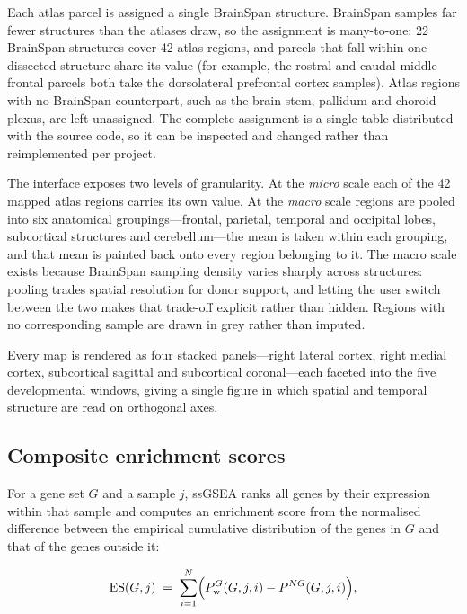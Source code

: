 \documentclass[pdflatex,sn-basic]{sn-jnl}
\begin{document}
Each atlas parcel is assigned a single BrainSpan structure. BrainSpan samples
far fewer structures than the atlases draw, so the assignment is many-to-one:
22 BrainSpan structures cover 42 atlas regions, and parcels that fall within
one dissected structure share its value (for example, the rostral and caudal
middle frontal parcels both take the dorsolateral prefrontal cortex samples).
Atlas regions with no BrainSpan counterpart, such as the brain stem, pallidum
and choroid plexus, are left unassigned. The complete assignment is a single
table distributed with the source code, so it can be inspected and changed
rather than reimplemented per project.

The interface exposes two levels of granularity. At the \emph{micro} scale each
of the 42 mapped atlas regions carries its own value. At the \emph{macro} scale
regions are pooled into six anatomical groupings---frontal, parietal, temporal
and occipital lobes, subcortical structures and cerebellum---the mean is taken
within each grouping, and that mean is painted back onto every region belonging
to it. The macro scale exists because BrainSpan sampling density varies sharply
across structures: pooling trades spatial resolution for donor support, and
letting the user switch between the two makes that trade-off explicit rather
than hidden. Regions with no corresponding sample are drawn in grey rather than
imputed.

Every map is rendered as four stacked panels---right lateral cortex, right
medial cortex, subcortical sagittal and subcortical coronal---each faceted into
the five developmental windows, giving a single figure in which spatial and
temporal structure are read on orthogonal axes.

\subsection{Composite enrichment scores}\label{sec:ssgsea}

For a gene set $G$ and a sample $j$, ssGSEA \citep{Barbie2009} ranks all genes
by their expression within that sample and computes an enrichment score from
the normalised difference between the empirical cumulative distribution of the
genes in $G$ and that of the genes outside it:

\begin{equation}\label{eq:ssgsea}
\mathrm{ES}(G, j) \;=\;
\sum_{i=1}^{N}\Bigl( P^{G}_{\mathrm{w}}(G, j, i) - P^{NG}(G, j, i) \Bigr),
\end{equation}
\end{document}

